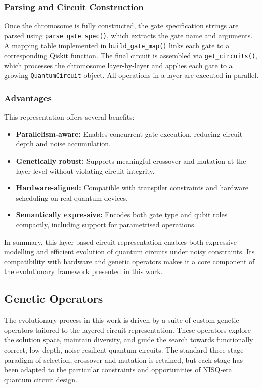 \documentclass[11pt,a4paper]{article}
\begin{document}
\subsubsection*{Parsing and Circuit Construction}
Once the chromosome is fully constructed, the gate specification strings are parsed using \texttt{parse\_gate\_spec()}, which extracts the gate name and arguments. A mapping table implemented in \texttt{build\_gate\_map()} links each gate to a corresponding Qiskit function. The final circuit is assembled via \texttt{get\_circuits()}, which processes the chromosome layer-by-layer and applies each gate to a growing \texttt{QuantumCircuit} object. All operations in a layer are executed in parallel.

\subsubsection*{Advantages}

This representation offers several benefits:
\begin{itemize}
    \item \textbf{Parallelism-aware:} Enables concurrent gate execution, reducing circuit depth and noise accumulation.
    \item \textbf{Genetically robust:} Supports meaningful crossover and mutation at the layer level without violating circuit integrity.
    \item \textbf{Hardware-aligned:} Compatible with transpiler constraints and hardware scheduling on real quantum devices.
    \item \textbf{Semantically expressive:} Encodes both gate type and qubit roles compactly, including support for parametrised operations.
\end{itemize}

In summary, this layer-based circuit representation enables both expressive modelling and efficient evolution of quantum circuits under noisy constraints. Its compatibility with hardware and genetic operators makes it a core component of the evolutionary framework presented in this work.


\subsection{Genetic Operators}
The evolutionary process in this work is driven by a suite of custom genetic operators tailored to the layered circuit representation. These operators explore the solution space, maintain diversity, and guide the search towards functionally correct, low‐depth, noise‐resilient quantum circuits. The standard three‐stage paradigm of selection, crossover and mutation is retained, but each stage has been adapted to the particular constraints and opportunities of NISQ‐era quantum circuit design.
\end{document}

